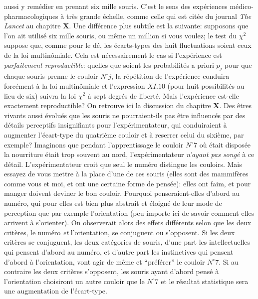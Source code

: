 aussi y rem\'edier en prenant six mille souris. C'est le sens des
exp\'eriences m\'edico-pharmacologiques \`a tr\`es grande \'echelle, 
comme celle qui est cit\'ee du journal {\sl The Lancet} au chapitre {\bf X}.
\medskip
Une diff\'erence plus subtile est la suivante: supposons que l'on ait
utilis\'e six mille souris, ou m\^eme un million si vous voulez; le test 
du $\chi^2$ suppose que, comme pour le d\'e, les \'ecarts-types des 
huit fluctuations soient ceux de la loi multin\^omiale.  Cela est
n\'ecessairement le cas si l'exp\'erience est {\it parfaitement 
reproductible}: quelles que soient les probabilit\'es a priori $p_j$ pour 
que chaque souris prenne le couloir $N^\circ j$, la r\'ep\'etition de 
l'exp\'erience conduira forc\'ement \`a la loi multin\^omiale et 
l'expression $XI.10$ (pour huit possibilit\'es au lieu de six) suivra la 
loi $\chi^2$ \`a sept degr\'es de libert\'e. Mais l'exp\'erience est-elle
exactement reproductible? On retrouve ici la discussion du chapitre {\bf
X}. Des \^etres vivants aussi \'evolu\'es que les souris ne pourraient-ils 
pas \^etre influenc\'es par des d\'etails perceptifs insignifiants pour
l'exp\'erimentateur, qui conduiraient \`a augmenter l'\'ecart-type du
quatri\`eme couloir et \`a reserrer celui du sixi\`eme, par exemple?
Imaginons que pendant l'apprentissage le couloir $N^\circ 7$ o\`u
\'etait dispos\'ee la nour\-ri\-ture \'etait trop souvent au nord,
l'exp\'erimentateur {\it n'ayant pas song\'e} \`a ce d\'etail.
L'exp\'erimentateur croit que seul le num\'ero distingue les couloirs. 
Mais essayez de vous mettre \`a la place d'une de ces souris (elles sont 
des mammif\`eres comme vous et moi, et ont une certaine forme de
pens\'ee): elles ont faim, et pour manger doivent deviner le bon couloir.
Pourquoi penseraient-elles d'abord au num\'ero, qui pour elles est bien 
plus abstrait et \'eloign\'e de leur mode de perception que par exemple
l'orientation (peu importe ici de savoir comment elles arrivent \`a
s'orienter). On observerait alors des effets diff\'erents selon que les
deux crit\`eres, le num\'ero {\it et} l'orientation,  se conjuguent ou
s'opposent.  Si les deux crit\`eres se conjuguent, les deux cat\'egories 
de souris, d'une part les intellectuelles qui pensent d'abord au num\'ero,
et d'autre part les instinctives qui pensent d'abord \`a l'orientation,
vont agir de m\^eme et ``pr\'ef\'erer'' le couloir $N^\circ 7$. Si au
contraire les deux crit\`eres s'opposent, les souris ayant d'abord 
pens\'e \`a l'orientation choisiront un autre couloir que le $N^\circ 7$
et le r\'esultat statistique sera une augmentation de l'\'ecart-type. 
